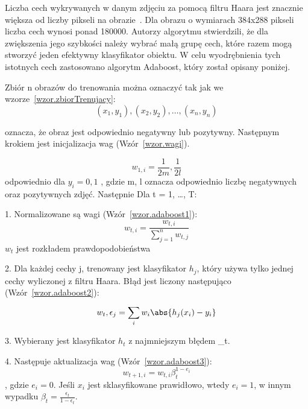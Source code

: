 \documentclass[a4paper,twoside,12pt]{book}
\begin{document}
    Liczba cech wykrywanych w danym zdjęciu za
    pomocą filtru Haara jest znacznie większa od liczby pikseli na obrazie~\cite{violaJones}.
    Dla obrazu o wymiarach 384x288 pikseli liczba cech wynosi ponad 180000.
    Autorzy algorytmu stwierdzili, że dla zwiększenia jego szybkości należy wybrać małą grupę cech,
    które razem mogą stworzyć jeden efektywny klasyfikator obiektu.
    W celu wyodrębnienia tych istotnych cech zastosowano algorytm Adaboost, który został opisany poniżej.

    Zbiór n obrazów do trenowania można oznaczyć tak jak we wzorze~\ref{wzor.zbiorTrenujacy}:
    \large
    \begin{equation}
        (x_1, y_1), (x_2, y_2), \ldots, (x_n, y_n)
        \label{wzor.zbiorTrenujacy}
    \end{equation}
    \normalsize

    oznacza, że obraz jest odpowiednio negatywny lub pozytywny.
    Następnym krokiem jest inicjalizacja wag (Wzór~\ref{wzor.wagi}).

    \large
    \begin{equation}
        w_{1,i} = \frac{1}{2m}, \frac{1}{2l}
        \label{wzor.wagi}
    \end{equation}
    \normalsize
    odpowiednio dla $y_i = 0, 1$
    , gdzie m, l oznacza odpowiednio liczbę negatywnych oraz pozytywnych zdjęć.
    Następnie
    Dla t = 1, \ldots, T:

    1. Normalizowane są wagi (Wzór~\ref{wzor.adaboost1}):
    \large
    \begin{equation}
        w_{t,i} = \frac{w_{t,i}}{\sum_{j=1}^{n}w_{t,j}}
        \label{wzor.adaboost1}
    \end{equation}
    \normalsize
    $w_{t}$ jest rozkładem prawdopodobieństwa

    2. Dla każdej cechy j, trenowany jest klasyfikator $h_{j}$, który używa tylko jednej cechy wyliczonej z filtru Haara.
    Błąd jest liczony następująco (Wzór~\ref{wzor.adaboost2}):
    \large
    \begin{equation}
        w_{t}, \epsilon_{j} = \sum_{i}^{}w_{i} \abs{h_{j}(x_{i}) - y_{i}}
        \label{wzor.adaboost2}
    \end{equation}
    \normalsize

    3. Wybierany jest klasyfikator $h_{t}$ z najmniejszym błędem \epsilon_{t}.

    4. Następuje aktualizacja wag (Wzór~\ref{wzor.adaboost3}):
    \large
    \begin{equation}
        w_{t+1,i} = w_{t,i}\beta_{t}^{1-e_{i}}
        \label{wzor.adaboost3}
    \end{equation}
    \normalsize
    , gdzie $e_{i} = 0$. Jeśli $x_{i}$ jest sklasyfikowane prawidłowo, wtedy $e_{i}=1$,
    w innym wypadku $\beta_{t} = \frac{\epsilon_{t}}{1 - \epsilon_{t}}$.
\end{document}
